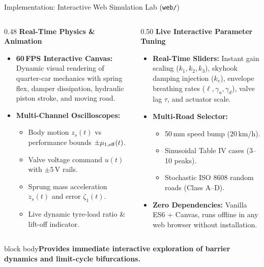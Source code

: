 \documentclass[aspectratio=169,10pt]{beamer}
\newcommand{\takeaway}[1]{\vfill\begin{beamercolorbox}[wd=\linewidth,sep=1ex]{block body}\color{accent}\bfseries #1\end{beamercolorbox}}
\begin{document}
\begin{frame}{Implementation: Interactive Web Simulation Lab (\texttt{web/})}
\begin{columns}[T]
\begin{column}{0.48\linewidth}
{\color{accent}\bfseries Real-Time Physics \& Animation}
\begin{itemize}\itemsep1.5pt\footnotesize
\item \textbf{60\,FPS Interactive Canvas:} Dynamic visual rendering of quarter-car mechanics with spring flex, damper dissipation, hydraulic piston stroke, and moving road.
\item \textbf{Multi-Channel Oscilloscopes:}
\begin{itemize}\itemsep0.5pt
\item Body motion $z_s(t)$ vs performance bounds $\pm \mu_{1,\rm eff}(t)$.
\item Valve voltage command $u(t)$ with $\pm5$\,V rails.
\item Sprung mass acceleration $\ddot{z}_s(t)$ and error $\zeta_1(t)$.
\item Live dynamic tyre-load ratio \& lift-off indicator.
\end{itemize}
\end{itemize}
\end{column}
\begin{column}{0.50\linewidth}
{\color{accent}\bfseries Live Interactive Parameter Tuning}
\begin{itemize}\itemsep1.5pt\footnotesize
\item \textbf{Real-Time Sliders:} Instant gain scaling ($k_1, k_2, k_3$), skyhook damping injection ($k_v$), envelope breathing rates ($\ell, \gamma_u, \gamma_d$), valve lag $\tau$, and actuator scale.
\item \textbf{Multi-Road Selector:}
\begin{itemize}\itemsep0.5pt
\item 50\,mm speed bump ($20$\,km/h).
\item Sinusoidal Table IV cases (3--10 peaks).
\item Stochastic ISO 8608 random roads (Class A--D).
\end{itemize}
\item \textbf{Zero Dependencies:} Vanilla ES6 + Canvas, runs offline in any web browser without installation.
\end{itemize}
\end{column}
\end{columns}
\par\vspace{0.05cm}
\takeaway{Provides immediate interactive exploration of barrier dynamics and limit-cycle bifurcations.}
\end{frame}
\end{document}
